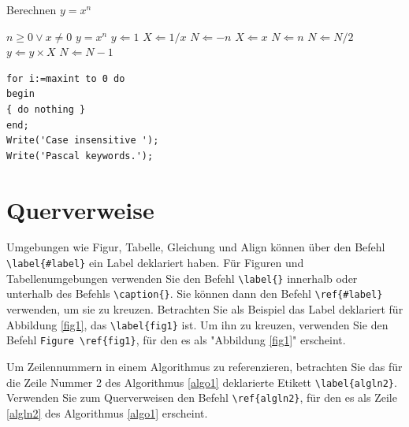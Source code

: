 \documentclass[pdflatex,sn-mathphys-num]{sn-jnl}%
\theoremstyle{thmstyleone}%
\theoremstyle{thmstyletwo}%
\theoremstyle{thmstylethree}%
\begin{document}
\begin{algorithm}
\caption{Berechnen $y = x^n$}\label{algo1}
\begin{algorithmic}[1] \Require $n \geq 0 \vee x \neq 0$ \Ensure $y = x^n$ \State $y \Leftarrow 1$ \label{algln2} \State $X \Leftarrow 1 / x$ \State $N \Leftarrow -n$ \Else \State $X \Leftarrow x$ \State $N \Leftarrow n$ \EndIf {}  \State \State $N \Leftarrow N / 2$  \State $y \Leftarrow y \times X$ \State $N \Leftarrow N - 1$ \EndIf \EndWhile
\end{algorithmic}
\end{algorithm}

\bigskip\begin{minipage}{\hsize}%
\lstset{frame=single,framexleftmargin=-1pt,framexrightmargin=-17pt,framesep=12pt,linewidth=0.98\textwidth,language=pascal}%
\begin{lstlisting}
for i:=maxint to 0 do
begin
{ do nothing }
end;
Write('Case insensitive ');
Write('Pascal keywords.');
\end{lstlisting}
\end{minipage}

\section{Querverweise}\label{sec8}

Umgebungen wie Figur, Tabelle, Gleichung und Align können über den Befehl \verb+\label{#label}+ ein Label deklariert haben. Für Figuren und Tabellenumgebungen verwenden Sie den Befehl \verb+\label{}+ innerhalb oder unterhalb des Befehls \verb+\caption{}+. Sie können dann den Befehl \verb+\ref{#label}+ verwenden, um sie zu kreuzen. Betrachten Sie als Beispiel das Label deklariert für Abbildung \ref{fig1}, das \verb+\label{fig1}+ ist. Um ihn zu kreuzen, verwenden Sie den Befehl \verb+Figure \ref{fig1}+, für den es als "Abbildung \ref{fig1}" erscheint.

Um Zeilennummern in einem Algorithmus zu referenzieren, betrachten Sie das für die Zeile Nummer 2 des Algorithmus \ref{algo1} deklarierte Etikett \verb+\label{algln2}+. Verwenden Sie zum Querverweisen den Befehl \verb+\ref{algln2}+, für den es als Zeile \ref{algln2} des Algorithmus \ref{algo1} erscheint.
\end{document}

